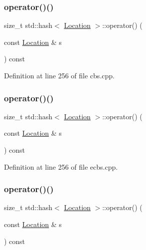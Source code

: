 \subsubsection{\texorpdfstring{operator()()}{operator()()}\hspace{0.1cm}{\footnotesize\ttfamily [1/3]}}
{\footnotesize\ttfamily size\+\_\+t std\+::hash$<$ \hyperlink{struct_location}{Location} $>$\+::operator() (\begin{DoxyParamCaption}\item[{const \hyperlink{struct_location}{Location} \&}]{s }\end{DoxyParamCaption}) const\hspace{0.3cm}{\ttfamily [inline]}}



Definition at line 256 of file cbs.\+cpp.

\mbox{\label{structstd_1_1hash_3_01_location_01_4_a51d2a62300e726c24c2372482698a89b}} 
\subsubsection{\texorpdfstring{operator()()}{operator()()}\hspace{0.1cm}{\footnotesize\ttfamily [2/3]}}
{\footnotesize\ttfamily size\+\_\+t std\+::hash$<$ \hyperlink{struct_location}{Location} $>$\+::operator() (\begin{DoxyParamCaption}\item[{const \hyperlink{struct_location}{Location} \&}]{s }\end{DoxyParamCaption}) const\hspace{0.3cm}{\ttfamily [inline]}}



Definition at line 256 of file ecbs.\+cpp.

\mbox{\label{structstd_1_1hash_3_01_location_01_4_a51d2a62300e726c24c2372482698a89b}} 
\subsubsection{\texorpdfstring{operator()()}{operator()()}\hspace{0.1cm}{\footnotesize\ttfamily [3/3]}}
{\footnotesize\ttfamily size\+\_\+t std\+::hash$<$ \hyperlink{structlib_multi_robot_planning_1_1_location}{Location} $>$\+::operator() (\begin{DoxyParamCaption}\item[{const \hyperlink{structlib_multi_robot_planning_1_1_location}{Location} \&}]{s }\end{DoxyParamCaption}) const\hspace{0.3cm}{\ttfamily [inline]}}



